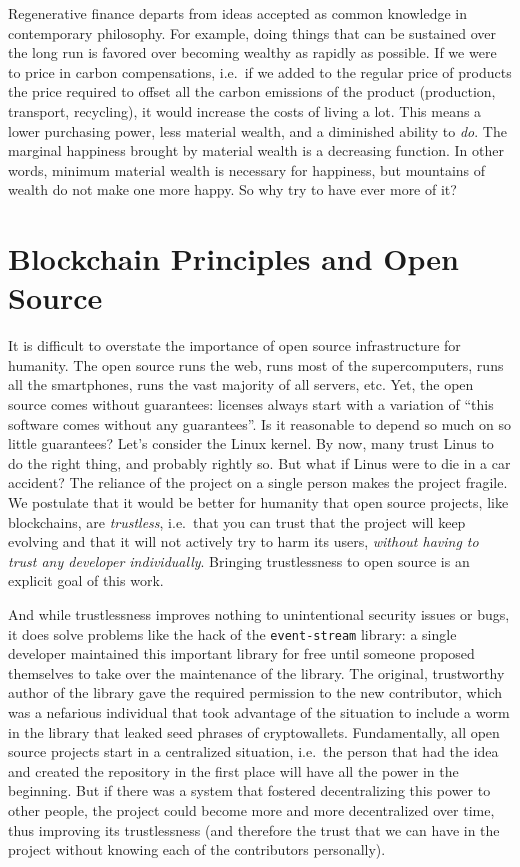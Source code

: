 Regenerative finance departs from ideas accepted as common knowledge in contemporary philosophy.
For example, doing things that can be sustained over the long run is favored over becoming wealthy as rapidly as possible.
If we were to price in carbon compensations, i.e.\ if we added to the regular price of products the price required to offset all the carbon emissions of the product (production, transport, recycling), it would increase the costs of living a lot.
This means a lower purchasing power, less material wealth, and a diminished ability to \emph{do}.
The marginal happiness brought by material wealth is a decreasing function.
In other words, minimum material wealth is necessary for happiness, but mountains of wealth do not make one more happy.
So why try to have ever more of it?

\section{Blockchain Principles and Open Source}

It is difficult to overstate the importance of open source infrastructure for humanity.
The open source runs the web, runs most of the supercomputers, runs all the smartphones, runs the vast majority of all servers, etc.
Yet, the open source comes without guarantees: licenses always start with a variation of \enquote{this software comes without any guarantees}.
Is it reasonable to depend so much on so little guarantees?
Let's consider the Linux kernel.
By now, many trust Linus to do the right thing, and probably rightly so.
But what if Linus were to die in a car accident?
The reliance of the project on a single person makes the project fragile.
We postulate that it would be better for humanity that open source projects, like blockchains, are \emph{trustless}, i.e.\ that you can trust that the project will keep evolving and that it will not actively try to harm its users, \emph{without having to trust any developer individually}.
Bringing trustlessness to open source is an explicit goal of this work.

And while trustlessness improves nothing to unintentional security issues or bugs, it does solve problems like the hack of the \texttt{event-stream} library: a single developer maintained this important library for free until someone proposed themselves to take over the maintenance of the library.
The original, trustworthy author of the library gave the required permission to the new contributor, which was a nefarious individual that took advantage of the situation to include a worm in the library that leaked seed phrases of cryptowallets.
Fundamentally, all open source projects start in a centralized situation, i.e.\ the person that had the idea and created the repository in the first place will have all the power in the beginning.
But if there was a system that fostered decentralizing this power to other people, the project could become more and more decentralized over time, thus improving its trustlessness (and therefore the trust that we can have in the project without knowing each of the contributors personally).

